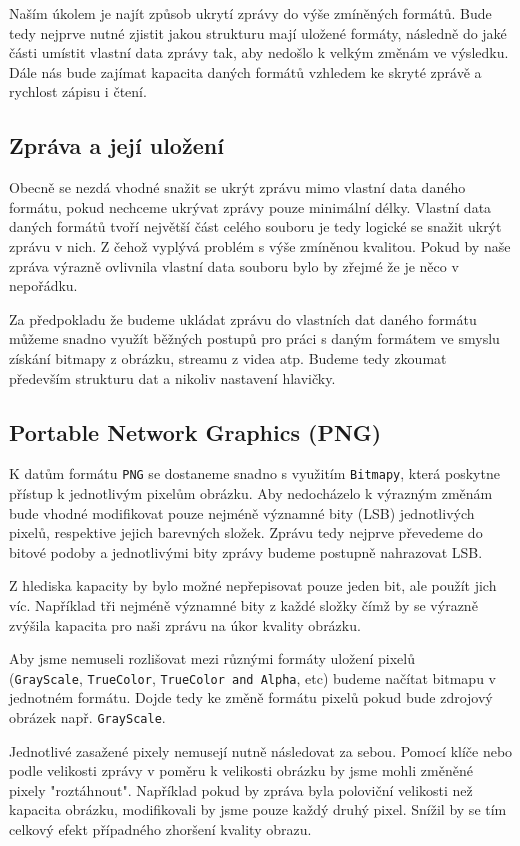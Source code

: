 \documentclass[12pt]{article}
\begin{document}
Naším úkolem je najít způsob ukrytí zprávy do výše zmíněných formátů. Bude tedy nejprve nutné zjistit jakou strukturu mají uložené formáty, následně do jaké části umístit vlastní data zprávy tak, aby nedošlo k velkým změnám ve výsledku. Dále nás bude zajímat kapacita daných formátů vzhledem ke skryté zprávě a rychlost zápisu i čtení.

\subsection{Zpráva a její uložení}
Obecně se nezdá vhodné snažit se ukrýt zprávu mimo vlastní data daného formátu, pokud nechceme ukrývat zprávy pouze minimální délky. Vlastní data daných formátů tvoří největší část celého souboru je tedy logické se snažit ukrýt zprávu v nich. Z čehož vyplývá problém s výše zmíněnou kvalitou. Pokud by naše zpráva výrazně ovlivnila vlastní data souboru bylo by zřejmé že je něco v nepořádku.

Za předpokladu že budeme ukládat zprávu do vlastních dat daného formátu můžeme snadno využít běžných postupů pro práci s daným formátem ve smyslu získání bitmapy z obrázku, streamu z videa atp. Budeme tedy zkoumat především strukturu dat a nikoliv nastavení hlavičky.

\pagebreak
\subsection{Portable Network Graphics (PNG)}
K datům formátu \texttt{PNG} se dostaneme snadno s využitím \texttt{Bitmapy}, která poskytne přístup k jednotlivým pixelům obrázku. Aby nedocházelo k výrazným změnám bude vhodné modifikovat pouze nejméně významné bity (LSB) jednotlivých pixelů, respektive jejich barevných složek. Zprávu tedy nejprve převedeme do bitové podoby a jednotlivými bity zprávy budeme postupně nahrazovat LSB.

Z hlediska kapacity by bylo možné nepřepisovat pouze jeden bit, ale použít jich víc. Například tři nejméně významné bity z každé složky čímž by se výrazně zvýšila kapacita pro naši zprávu na úkor kvality obrázku. 

Aby jsme nemuseli rozlišovat mezi různými formáty uložení pixelů\\ (\texttt{GrayScale}, \texttt{TrueColor}, \texttt{TrueColor and Alpha}, etc) budeme načítat bitmapu v jednotném formátu. Dojde tedy ke změně formátu pixelů pokud bude zdrojový obrázek např. \texttt{GrayScale}.

Jednotlivé zasažené pixely nemusejí nutně následovat za sebou. Pomocí klíče nebo podle velikosti zprávy v poměru k velikosti obrázku by jsme mohli změněné pixely "roztáhnout". Například pokud by zpráva byla poloviční velikosti než kapacita obrázku, modifikovali by jsme pouze každý druhý pixel. Snížil by se tím celkový efekt případného zhoršení kvality obrazu.
\end{document}
